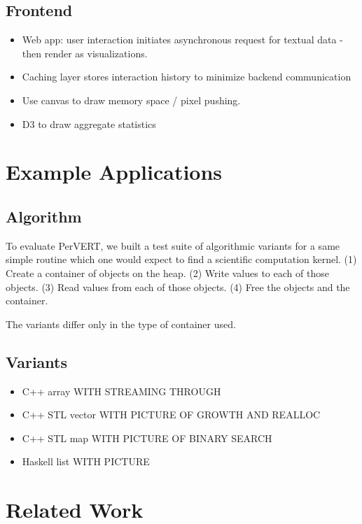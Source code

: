 \documentclass[annual]{acmsiggraph}
\begin{document}
  \subsection{Frontend}
    \begin{itemize}
      \item Web app: user interaction initiates asynchronous request for textual data - then render as visualizations.
      \item Caching layer stores interaction history to minimize backend communication
      \item Use canvas to draw memory space / pixel pushing.
      \item D3 to draw aggregate statistics
    \end{itemize}

\section{Example Applications}\label{ch_e}

  \subsection{Algorithm}
    To evaluate PerVERT, we built a test suite of algorithmic variants for a same simple routine
      which one would expect to find a scientific computation kernel.
    (1) Create a container of objects on the heap.
    (2) Write values to each of those objects.
    (3) Read values from each of those objects.
    (4) Free the objects and the container.

    The variants differ only in the type of container used.

  \subsection{Variants}
    \begin{itemize}
      \item C++ array WITH STREAMING THROUGH
      \item C++ STL vector WITH PICTURE OF GROWTH AND REALLOC
      \item C++ STL map WITH PICTURE OF BINARY SEARCH
      \item Haskell list WITH PICTURE
    \end{itemize}

\section{Related Work}\label{ch_r}
\end{document}
